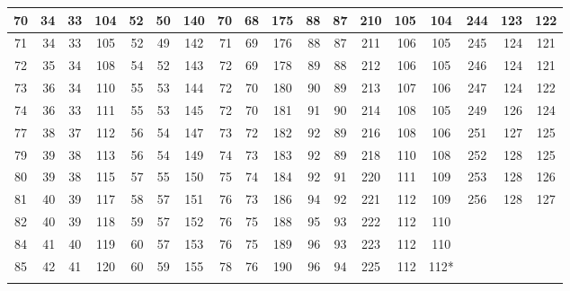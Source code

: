\documentclass{article}
\theoremstyle{definition}
\theoremstyle{remark}
\begin{document}
\begin{table}[p]
{\begin{minipage}{0.92\textheight}
{\begin{tabular}{c|r|c||c|r|c||c|r|c||c|r|c||c|r|c||c|r|c}
\hline
70 & 34 & 33 & 104 & 52 & 50 & 140 & 70 & 68 & 175 & 88 & 87 & 210 & 105 & 104 & 244 & 123 & 122\\
\hline
71 & 34 & 33 & 105 & 52 & 49 & 142 & 71 & 69 & 176 & 88 & 87 & 211 & 106 & 105 & 245 & 124 & 121\\
\hline
72 & 35 & 34 & 108 & 54 & 52 & 143 & 72 & 69 & 178 & 89 & 88 & 212 & 106 & 105 & 246 & 124 & 121\\
\hline
73 & 36 & 34 & 110 & 55 & 53 & 144 & 72 & 70 & 180 & 90 & 89 & 213 & 107 & 106 & 247 & 124 & 122\\
\hline
74 & 36 & 33 & 111 & 55 & 53 & 145 & 72 & 70 & 181 & 91 & 90 & 214 & 108 & 105 & 249 & 126 & 124\\
\hline
77 & 38 & 37 & 112 & 56 & 54 & 147 & 73 & 72 & 182 & 92 & 89 & 216 & 108 & 106 & 251 & 127 & 125\\
\hline
79 & 39 & 38 & 113 & 56 & 54 & 149 & 74 & 73 & 183 & 92 & 89 & 218 & 110 & 108 & 252 & 128 & 125\\
\hline
80 & 39 & 38 & 115 & 57 & 55 & 150 & 75 & 74 & 184 & 92 & 91 & 220 & 111 & 109 & 253 & 128 & 126\\
\hline
81 & 40 & 39 & 117 & 58 & 57 & 151 & 76 & 73 & 186 & 94 & 92 & 221 & 112 & 109 & 256 & 128 & 127\\
\hline
82 & 40 & 39 & 118 & 59 & 57 & 152 & 76 & 75 & 188 & 95 & 93 & 222 & 112 & 110 &  &  & \\
\hline
84 & 41 & 40 & 119 & 60 & 57 & 153 & 76 & 75 & 189 & 96 & 93 & 223 & 112 & 110 &  &  & \\
\hline
85 & 42 & 41 & 120 & 60 & 59 & 155 & 78 & 76 & 190 & 96 & 94 & 225 & 112 & 112* &  &  & \\
\Xhline{2\arrayrulewidth}
\end{tabular}%
}
\end{minipage}%
}
\end{table}
\end{document}

